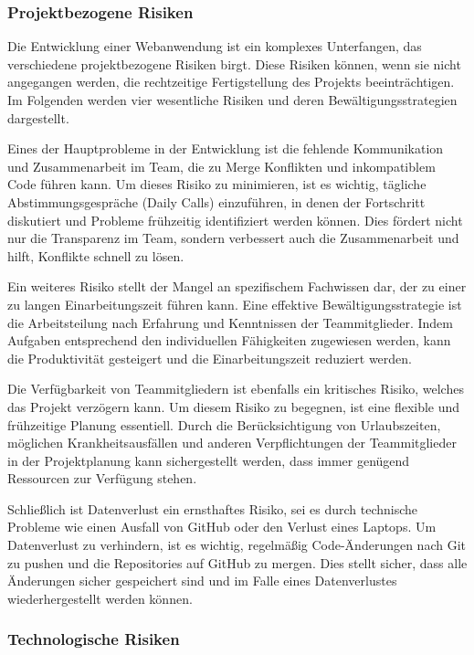 \documentclass[../main.tex]{subfiles}
\begin{document}
\subsubsection{Projektbezogene Risiken}
Die Entwicklung einer Webanwendung ist ein komplexes Unterfangen, das verschiedene projektbezogene Risiken birgt. Diese Risiken 
können, wenn sie nicht angegangen werden, die rechtzeitige Fertigstellung des Projekts beeinträchtigen. Im Folgenden werden vier 
wesentliche Risiken und deren Bewältigungsstrategien dargestellt.

Eines der Hauptprobleme in der Entwicklung ist die fehlende Kommunikation und Zusammenarbeit im Team, die zu Merge Konflikten und 
inkompatiblem Code führen kann. Um dieses Risiko zu minimieren, ist es wichtig, tägliche Abstimmungsgespräche (Daily Calls) einzuführen, 
in denen der Fortschritt diskutiert und Probleme frühzeitig identifiziert werden können. Dies fördert nicht nur die Transparenz im Team, 
sondern verbessert auch die Zusammenarbeit und hilft, Konflikte schnell zu lösen.

Ein weiteres Risiko stellt der Mangel an spezifischem Fachwissen dar, der zu einer zu langen Einarbeitungszeit führen kann. Eine 
effektive Bewältigungsstrategie ist die Arbeitsteilung nach Erfahrung und Kenntnissen der Teammitglieder. Indem Aufgaben entsprechend 
den individuellen Fähigkeiten zugewiesen werden, kann die Produktivität gesteigert und die Einarbeitungszeit reduziert werden.

Die Verfügbarkeit von Teammitgliedern ist ebenfalls ein kritisches Risiko, welches das Projekt verzögern kann. Um diesem Risiko zu begegnen, 
ist eine flexible und frühzeitige Planung essentiell. Durch die Berücksichtigung von Urlaubszeiten, möglichen Krankheitsausfällen und 
anderen Verpflichtungen der Teammitglieder in der Projektplanung kann sichergestellt werden, dass immer genügend Ressourcen zur Verfügung 
stehen.

Schließlich ist Datenverlust ein ernsthaftes Risiko, sei es durch technische Probleme wie einen Ausfall von GitHub oder den Verlust eines 
Laptops. Um Datenverlust zu verhindern, ist es wichtig, regelmäßig Code-Änderungen nach Git zu pushen und die Repositories auf GitHub zu 
mergen. Dies stellt sicher, dass alle Änderungen sicher gespeichert sind und im Falle eines Datenverlustes wiederhergestellt werden können.

\subsubsection{Technologische Risiken}
\end{document}
